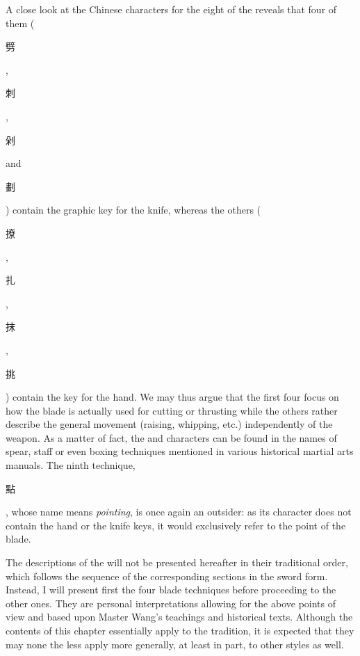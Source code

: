 A close look at the Chinese characters for the eight \Jianfa{} of the \Yangjia{} \Michuan{} reveals that four of them (\Pi{} \begin{CJK*}{UTF8}{bsmi}劈\end{CJK*}, \Ci{} \begin{CJK*}{UTF8}{bsmi}刺\end{CJK*}, \Duo{} \begin{CJK*}{UTF8}{bsmi}剁\end{CJK*} and \Hua{} \begin{CJK*}{UTF8}{bsmi}劃\end{CJK*}) contain the graphic key for the knife, whereas the others (\Liao{} \begin{CJK*}{UTF8}{bsmi}撩\end{CJK*}, \Zha{} \begin{CJK*}{UTF8}{bsmi}扎\end{CJK*}, \Mo{} \begin{CJK*}{UTF8}{bsmi}抹\end{CJK*}, \Tiao{} \begin{CJK*}{UTF8}{bsmi}挑\end{CJK*}) contain the key for the hand. We may thus argue that the first four focus on how the blade is actually used for cutting or thrusting while the others rather describe the general movement (raising, whipping, etc.) independently of the weapon. As a matter of fact, the \Liao{} and \Zha{} characters can be found in the names of spear, staff or even boxing techniques mentioned in various historical martial arts manuals. The ninth technique, \Dian{} \begin{CJK*}{UTF8}{bsmi}點\end{CJK*}, whose name means \textit{pointing}, is once again an outsider: as its character does not contain the hand or the knife keys, it would exclusively refer to the point of the blade. 

The descriptions of the \Yangjia{} \Michuan{} \Taijijian{} \Jiben{} \Jianfa{} will not  be presented hereafter in their traditional order, which follows the sequence of the corresponding sections in the \Kunlun{} sword form. Instead, I will present first the four blade techniques before proceeding to the other ones. They are personal interpretations allowing for the above points of view and based upon Master Wang's teachings and historical texts. Although the contents of this chapter essentially apply to the \Yangjia{} \Michuan{} tradition, it is expected that they may none the less apply more generally, at least in part, to other styles as well. 

